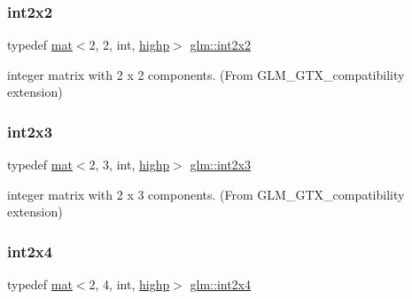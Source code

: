 \subsubsection{\texorpdfstring{int2x2}{int2x2}}
{\footnotesize\ttfamily typedef \mbox{\hyperlink{structglm_1_1mat}{mat}}$<$2, 2, int, \mbox{\hyperlink{namespaceglm_a36ed105b07c7746804d7fdc7cc90ff25ac6f7eab42eacbb10d59a58e95e362074}{highp}}$>$ \mbox{\hyperlink{group__gtx__compatibility_ga8884c82366cc406dd20e00b78969d001}{glm\+::int2x2}}}



integer matrix with 2 x 2 components. (From G\+L\+M\+\_\+\+G\+T\+X\+\_\+compatibility extension) 

\mbox{\label{group__gtx__compatibility_ga13c7e3ba6d19765d8877cccf05c2e520}} 
\subsubsection{\texorpdfstring{int2x3}{int2x3}}
{\footnotesize\ttfamily typedef \mbox{\hyperlink{structglm_1_1mat}{mat}}$<$2, 3, int, \mbox{\hyperlink{namespaceglm_a36ed105b07c7746804d7fdc7cc90ff25ac6f7eab42eacbb10d59a58e95e362074}{highp}}$>$ \mbox{\hyperlink{group__gtx__compatibility_ga13c7e3ba6d19765d8877cccf05c2e520}{glm\+::int2x3}}}



integer matrix with 2 x 3 components. (From G\+L\+M\+\_\+\+G\+T\+X\+\_\+compatibility extension) 

\mbox{\label{group__gtx__compatibility_gab5fea62bdc861a2b0dd5ae6147b88975}} 
\subsubsection{\texorpdfstring{int2x4}{int2x4}}
{\footnotesize\ttfamily typedef \mbox{\hyperlink{structglm_1_1mat}{mat}}$<$2, 4, int, \mbox{\hyperlink{namespaceglm_a36ed105b07c7746804d7fdc7cc90ff25ac6f7eab42eacbb10d59a58e95e362074}{highp}}$>$ \mbox{\hyperlink{group__gtx__compatibility_gab5fea62bdc861a2b0dd5ae6147b88975}{glm\+::int2x4}}}



